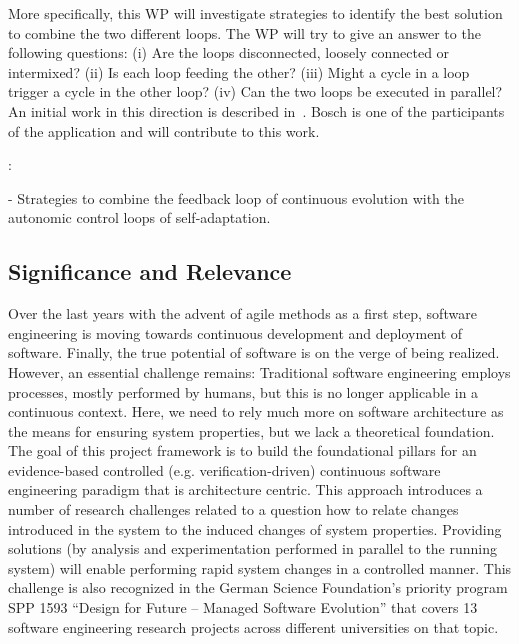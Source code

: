 \documentclass[12pt]{article}
\begin{document}
More specifically, this WP will investigate strategies to identify the best solution to combine the two different loops. The WP will try to give an answer to the following questions:
(i) Are the loops disconnected, loosely connected or intermixed? 
(ii) Is each loop feeding the other?
(iii) Might a cycle in a loop trigger a cycle in the other loop? 
(iv) Can the two loops be executed in parallel? 
An initial work in this direction is described in~\cite{Bosch2016}. Bosch is one of the participants of the application and will contribute to this work.

:
 
 - Strategies to combine the feedback loop of continuous evolution with the autonomic control loops of self-adaptation.

%
%
%
%
% 



\vspace{-.1cm}

\subsection{Significance and Relevance}

Over the last years with the advent of agile methods as a first step, software engineering is moving towards continuous development and deployment of software. Finally, the true potential of software is on the verge of being realized. However, an essential challenge remains: Traditional software engineering employs processes, mostly performed by humans, but this is no longer applicable in a continuous context. Here, we need to rely much more on software architecture as the means for ensuring system properties, but we lack a theoretical foundation. The goal of this project framework is to build the foundational pillars for an evidence-based 
controlled (e.g. verification-driven) continuous software engineering paradigm that is architecture centric. This approach introduces a number of research challenges related to a question how to relate changes introduced in the system to the induced changes of system properties. Providing solutions (by analysis and experimentation performed in parallel to the running system) will enable performing rapid system changes in a controlled manner. This challenge is also recognized in the German Science Foundation's priority program SPP 1593 ``Design for Future – Managed Software Evolution'' that covers 13 software engineering research projects across different universities on that topic.
\end{document}
